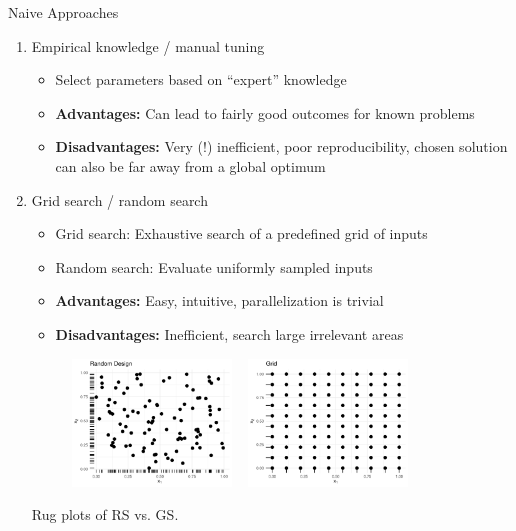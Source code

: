 \documentclass[11pt,compress,t,notes=noshow, xcolor=table]{beamer}
\begin{document}
\begin{vbframe}{Naive Approaches}
\begin{enumerate}
\item Empirical knowledge / manual tuning
\begin{itemize}
\item Select parameters based on \enquote{expert} knowledge 
\item \textbf{Advantages:} Can lead to fairly good outcomes for known problems
\item \textbf{Disadvantages:} Very (!) inefficient, poor reproducibility, chosen solution can also be far away from a global optimum
\end{itemize}

\framebreak 
\item Grid search / random search
\begin{itemize}
\item Grid search: Exhaustive search of a predefined grid of inputs
\item Random search: Evaluate uniformly sampled inputs 
\item \textbf{Advantages: } Easy, intuitive, parallelization is trivial
\item \textbf{Disadvantages: } Inefficient, search large irrelevant areas
\end{itemize}
\vfill
\begin{center}
\begin{figure}
\includegraphics[width=0.4\textwidth]{figure_man/black_box_0.png} ~ \includegraphics[width=0.4\textwidth]{figure_man/black_box_1.png}
\end{figure}
\begin{footnotesize}
Rug plots of RS vs. GS.
\end{footnotesize}
\end{center}



\end{enumerate}
\end{vbframe}
\end{document}
